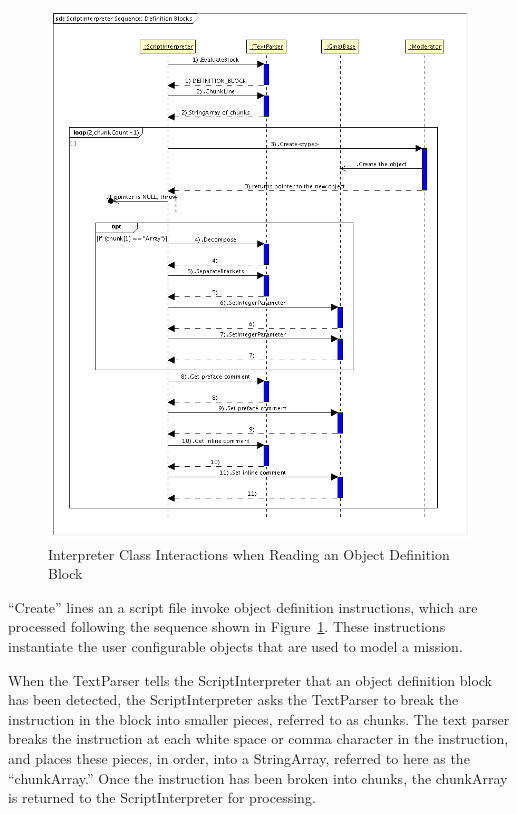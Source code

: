 \begin{figure}
\begin{center}
\includegraphics[400,502]{Images/ScriptInterpreterSequenceDefinitionBlocks.png}
\caption{\label{figure:InterpreterReadInteractionsDefinitionBlock}Interpreter Class Interactions
when Reading an Object Definition Block}
\end{center}
\end{figure}

``Create'' lines an a script file invoke object definition instructions, which are processed
following the sequence shown in Figure~\ref{figure:InterpreterReadInteractionsDefinitionBlock}.
These instructions instantiate the user configurable objects that are used to model a mission.

When the TextParser tells the ScriptInterpreter that an object definition block has been detected,
the ScriptInterpreter asks the TextParser to break the instruction in the block into smaller
pieces, referred to as chunks.  The text parser breaks the instruction at each white space or
comma character in the instruction, and places these pieces, in order, into a StringArray,
referred to here as the ``chunkArray.''  Once the instruction has been broken into chunks, the
chunkArray is returned to the ScriptInterpreter for processing.

